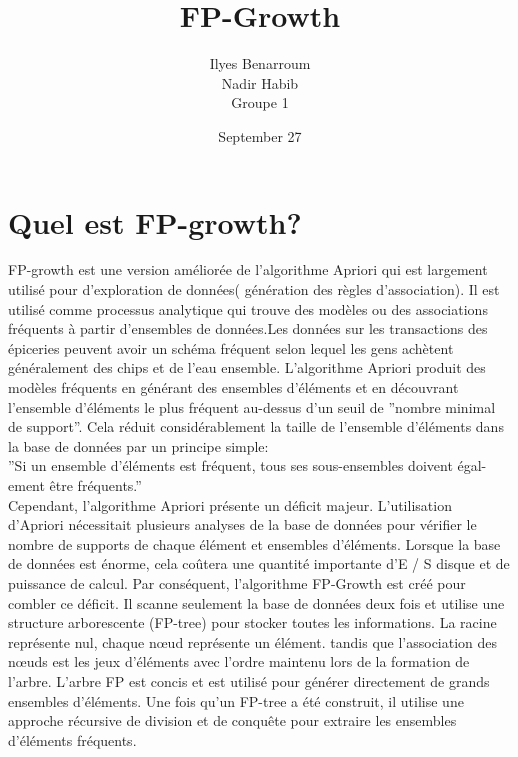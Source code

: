 \documentclass[a4paper,12pt]{article}
\author{Ilyes Benarroum \\
Nadir Habib \\
Groupe 1
}
\title{FP-Growth}
\date{September 27}
\begin{document}
\maketitle
\section{Quel est FP-growth?}
FP-growth est une version améliorée de l'algorithme Apriori qui est largement utilisé pour d'exploration de données( génération des règles d'association). Il est utilisé comme processus analytique qui trouve des modèles ou des associations fréquents à partir d'ensembles de données.Les données sur les transactions des épiceries peuvent avoir un schéma fréquent selon lequel les gens achètent généralement des chips et de l'eau ensemble. L'algorithme Apriori produit des modèles fréquents en générant des ensembles d'éléments et en découvrant l'ensemble d'éléments le plus fréquent au-dessus d'un seuil de ''nombre minimal de support''.
Cela réduit considérablement la taille de l'ensemble d'éléments dans la base de données par un principe simple:\\

''Si un ensemble d'éléments est fréquent, tous ses sous-ensembles doivent égal-ement être fréquents.''\\

Cependant, l'algorithme Apriori présente un déficit majeur. L'utilisation d'Apriori nécessitait plusieurs analyses de la base de données pour vérifier le nombre de supports de chaque élément et ensembles d'éléments.
Lorsque la base de données est énorme, cela coûtera une quantité importante d'E / S disque et de puissance de calcul. Par conséquent, l'algorithme FP-Growth est créé pour combler ce déficit. Il scanne seulement la base de données deux fois et utilise une structure arborescente (FP-tree) pour stocker toutes les informations. La racine représente nul, chaque nœud représente un élément.
tandis que l'association des nœuds est les jeux d'éléments avec l'ordre maintenu lors de la formation de l'arbre. L'arbre FP est concis et est utilisé pour générer directement de grands ensembles d'éléments. Une fois qu'un FP-tree a été construit, il utilise une approche récursive de division et de conquête pour extraire les ensembles d'éléments fréquents.
\pagebreak
\end{document}

